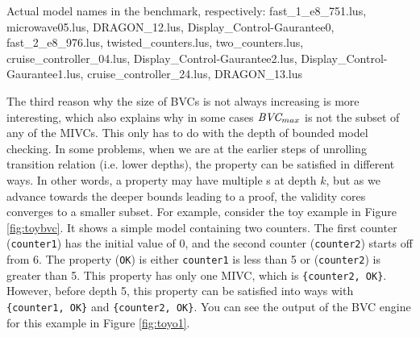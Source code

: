 \begin{table}
\vspace{0.07in}
{\small{Actual model names in the benchmark, respectively: fast\_1\_e8\_751.lus, microwave05.lus, DRAGON\_12.lus, Display\_Control-Gaurantee0, fast\_2\_e8\_976.lus, twisted\_counters.lus, two\_counters.lus, cruise\_controller\_04.lus, Display\_Control-Gaurantee2.lus, Display\_Control-Gaurantee1.lus, cruise\_controller\_24.lus, DRAGON\_13.lus}}
  \label{tab:bvc-abnormal}
\end{table}

The third reason why the size of BVCs is not always increasing is more interesting, which also explains why in some cases $\textit{BVC} _{max}$ is not the subset of any of the MIVCs. This only has to do with the depth of bounded model checking. In some problems, when we are at the earlier steps of unrolling transition relation (i.e. lower depths), the property can be satisfied in different ways. In other words, a property may have multiple \bvc s at depth $k$, but as we advance towards the deeper bounds leading to a proof, the validity cores converges to a smaller subset. For example, consider the toy example in Figure \ref{fig:toybvc}. It shows a simple model containing two counters. The first counter ({\small{\texttt{counter1}}}) has the initial value of 0, and the second counter ({\small{\texttt{counter2}}}) starts off from 6. The property ({\small{\texttt{OK}}}) is either {\small{\texttt{counter1}}} is less than 5 or ({\small{\texttt{counter2}}}) is greater than 5. This property has only one MIVC, which is {\small{\texttt{\{counter2, OK\}}}}. However, before depth 5, this property can be satisfied into ways with {\small{\texttt{\{counter1, OK\}}}} and {\small{\texttt{\{counter2, OK\}}}}. You can see the output of the BVC engine for this example in Figure \ref{fig:toyo1}.

